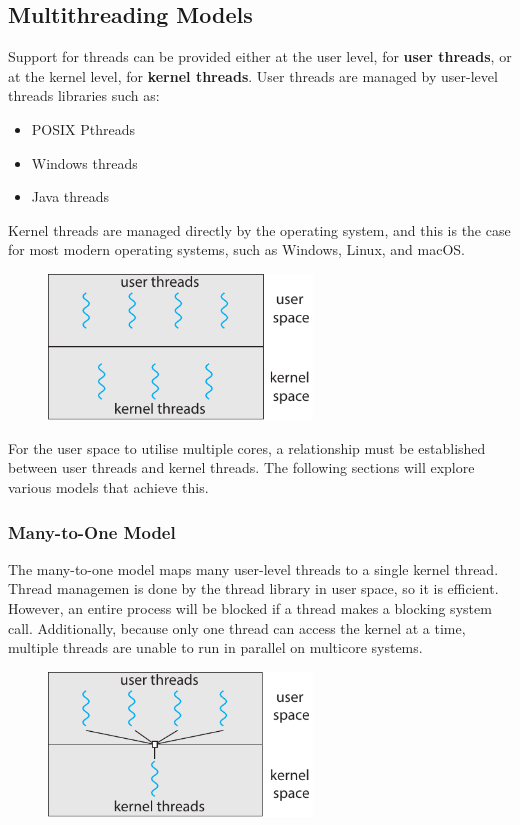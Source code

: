 \documentclass{article}
\begin{document}
\subsection{Multithreading Models}
Support for threads can be provided either at the user level, for
\textbf{user threads}, or at the kernel level, for \textbf{kernel
threads}. User threads are managed by user-level threads libraries such
as:
\begin{itemize}
    \item POSIX Pthreads
    \item Windows threads
    \item Java threads
\end{itemize}
Kernel threads are managed directly by the operating system, and this is
the case for most modern operating systems, such as Windows, Linux, and
macOS.\@
\begin{figure}[H]
    \centering
    \includegraphics[width = 7cm]{figures/threads_user_kernel.pdf}
\end{figure}
For the user space to utilise multiple cores, a relationship must be
established between user threads and kernel threads. The following
sections will explore various models that achieve this.
\subsubsection{Many-to-One Model}
The many-to-one model maps many user-level threads to a single kernel
thread. Thread managemen is done by the thread library in user space,
so it is efficient. However, an entire process will be blocked if a
thread makes a blocking system call. Additionally, because only one
thread can access the kernel at a time, multiple threads are unable to
run in parallel on multicore systems.
\begin{figure}[H]
    \centering
    \includegraphics[width = 7cm]{figures/threads_many_to_one.pdf}
\end{figure}
\end{document}
